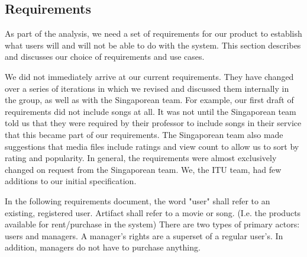 \subsection{Requirements}
As part of the analysis, we need a set of requirements for our product to
establish what users will and will not be able to do with the system. This
section describes and discusses our choice of requirements and use cases.

We did not immediately arrive at our current requirements. They have changed
over a series of iterations in which we revised and discussed them internally in
the group, as well as with the Singaporean team. For example, our first draft of
requirements did not include songs at all. It was not until the Singaporean team
told us that they were required by their professor to include songs in their
service that this became part of our requirements. The Singaporean team also
made suggestions that media files include ratings and view count to allow us to
sort by rating and popularity. In general, the requirements were almost
exclusively changed on request from the Singaporean team. We, the ITU team,
had few additions to our initial specification.

\label{sec:requirements}
In the following requirements document, the word "user" shall refer to an
existing, registered user. Artifact shall refer to a movie or song. (I.e. the
products available for rent/purchase in the system) There are two types of
primary actors: users and managers. A manager’s rights are a superset of a
regular user's. In addition, managers do not have to purchase anything. 

